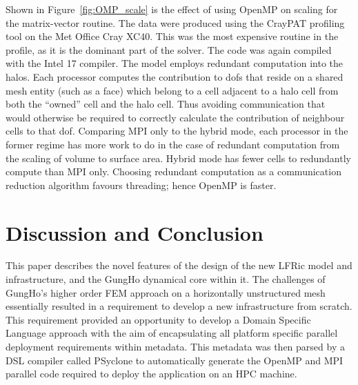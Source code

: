 \documentclass[review,times]{elsarticle}
\begin{document}
Shown in Figure~\ref{fig:OMP_scale} is the effect of using OpenMP on 
scaling for the matrix-vector routine. The data were produced using
the CrayPAT profiling tool on the Met Office Cray XC40. This was the
most expensive routine in the profile, as it is the dominant part of
the solver. The code was
again compiled with the Intel 17 compiler. The model employs redundant
computation into the halos. Each processor computes the contribution
to dofs that reside on a shared mesh
entity (such as a face) which belong to a cell adjacent to a halo cell
from both the ``owned'' cell and the halo cell. Thus avoiding
communication that would otherwise be required to correctly calculate
the contribution of neighbour cells to that dof. Comparing MPI only to
the hybrid mode, each processor in the former regime has more work to
do in the case of redundant computation from the scaling of volume to
surface area. Hybrid mode has fewer cells to redundantly compute than
MPI only. Choosing redundant computation as a communication reduction
algorithm favours threading; hence OpenMP is faster.
 

\section{\label{sec:con}Discussion and Conclusion}

This paper describes the novel features of the design of the new LFRic
model and infrastructure, and the GungHo dynamical core within it. The
challenges of GungHo's higher order FEM approach on a horizontally unstructured
mesh essentially resulted in a requirement to develop a new
infrastructure from scratch. This requirement provided an opportunity
to develop a Domain Specific Language approach with the aim of
encapsulating all platform specific parallel deployment requirements
within metadata. This metadata was then parsed by a DSL
compiler called PSyclone to automatically generate the OpenMP and MPI
parallel code required to deploy the application on an HPC machine.
\end{document}

